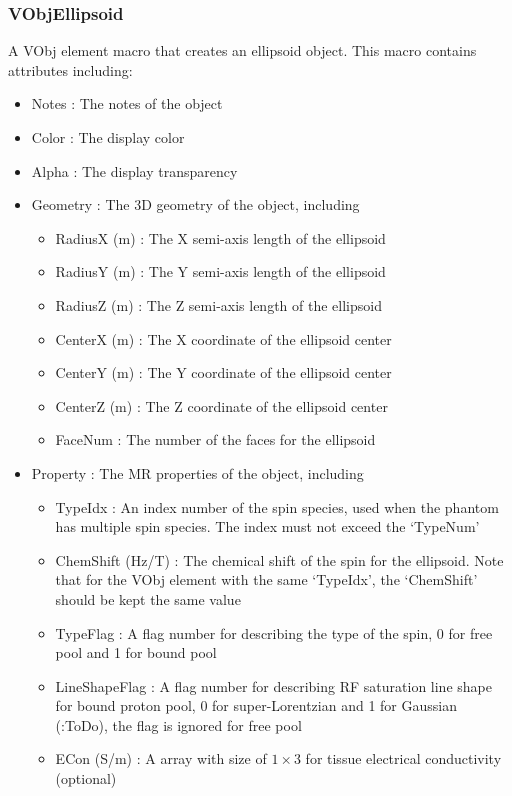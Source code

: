 \documentclass{book}%
\begin{document}
\subsubsection{VObjEllipsoid}

A VObj element macro that creates an ellipsoid object. This macro contains attributes including:

\begin{itemize}
	\item Notes : The notes of the object
	\item Color : The display color
	\item Alpha : The display transparency
	\item Geometry : The 3D geometry of the object, including
	\begin{itemize}
		\item RadiusX (m) : The X semi-axis length of the ellipsoid
		\item RadiusY (m) : The Y semi-axis length of the ellipsoid
		\item RadiusZ (m) : The Z semi-axis length of the ellipsoid
		\item CenterX (m) : The X coordinate of the ellipsoid center
		\item CenterY (m) : The Y coordinate of the ellipsoid center
		\item CenterZ (m) : The Z coordinate of the ellipsoid center
		\item FaceNum : The number of the faces for the ellipsoid
	\end{itemize}
	\item Property : The MR properties of the object, including
	\begin{itemize}
		\item TypeIdx : An index number of the spin species, used when the phantom has multiple spin species. The index must not exceed the `TypeNum'
		\item ChemShift (Hz/T) : The chemical shift of the spin for the ellipsoid. Note that for the VObj element with the same `TypeIdx', the `ChemShift' should be kept the same value
		\item TypeFlag : A flag number for describing the type of the spin, 0 for free pool and 1 for bound pool
		\item LineShapeFlag : A flag number for describing RF saturation line shape for bound proton pool, 0 for super-Lorentzian and 1 for Gaussian (:ToDo), the flag is ignored for free pool
		\item ECon (S/m) : A array with size of $1 \times 3 $ for tissue electrical conductivity (optional)

\end{itemize}
\end{itemize}
\end{document}
